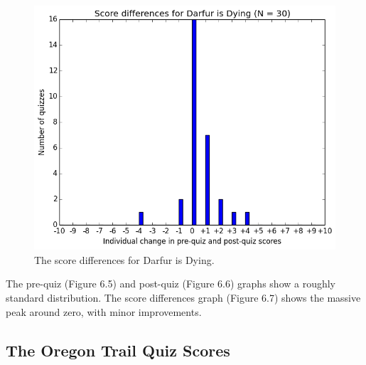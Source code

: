 			\begin{figure}[] 
			\centering 
			\includegraphics[width=\textwidth]{darfur_results.png} 
			\caption{The score differences for Darfur is Dying.}
			\end{figure}

			The pre-quiz (Figure 6.5) and post-quiz (Figure 6.6) graphs show a roughly standard distribution. The score differences graph (Figure 6.7) shows the massive peak around zero, with minor improvements.

			\clearpage

		\subsection{The Oregon Trail Quiz Scores}		

